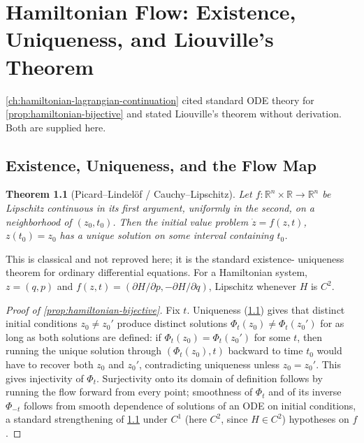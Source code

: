 \documentclass[11pt]{book}
\theoremstyle{plain}
\newtheorem{theorem}{Theorem}[chapter]
\theoremstyle{definition}
\theoremstyle{remark}
\begin{document}
\chapter{Hamiltonian Flow: Existence, Uniqueness, and Liouville's Theorem}
\label{app:hamiltonian-flow}

\cref{ch:hamiltonian-lagrangian-continuation} cited standard ODE
theory for \cref{prop:hamiltonian-bijective} and stated Liouville's
theorem without derivation. Both are supplied here.

\section{Existence, Uniqueness, and the Flow Map}

\begin{theorem}[Picard--Lindel\"of / Cauchy--Lipschitz]
\label{app:thm-picard-lindelof}
Let $f : \mathbb{R}^n \times \mathbb{R} \to \mathbb{R}^n$ be Lipschitz
continuous in its first argument, uniformly in the second, on a
neighborhood of $(z_0, t_0)$. Then the initial value problem $\dot z =
f(z,t)$, $z(t_0) = z_0$ has a unique solution on some interval
containing $t_0$.
\end{theorem}

This is classical and not reproved here; it is the standard existence-
uniqueness theorem for ordinary differential equations. For a
Hamiltonian system, $z = (q,p)$ and $f(z,t) = (\partial H/\partial p,
-\partial H/\partial q)$, Lipschitz whenever $H$ is $C^2$.

\begin{proof}[Proof of \cref{prop:hamiltonian-bijective}]
Fix $t$. Uniqueness (\cref{app:thm-picard-lindelof}) gives that
distinct initial conditions $z_0 \neq z_0'$ produce distinct solutions
$\Phi_t(z_0) \neq \Phi_t(z_0')$ for as long as both solutions are
defined: if $\Phi_t(z_0) = \Phi_t(z_0')$ for some $t$, then running the
unique solution through $(\Phi_t(z_0), t)$ backward to time $t_0$
would have to recover both $z_0$ and $z_0'$, contradicting uniqueness
unless $z_0 = z_0'$. This gives injectivity of $\Phi_t$. Surjectivity
onto its domain of definition follows by running the flow forward from
every point; smoothness of $\Phi_t$ and of its inverse $\Phi_{-t}$
follows from smooth dependence of solutions of an ODE on initial
conditions, a standard strengthening of
\cref{app:thm-picard-lindelof} under $C^1$ (here $C^2$, since $H \in
C^2$) hypotheses on $f$.
\end{proof}
\end{document}
